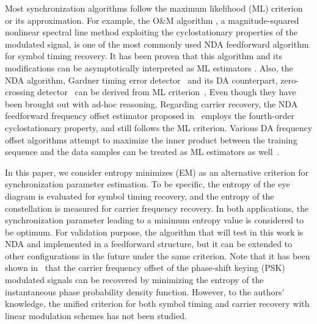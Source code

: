\documentclass[journal,comsoc]{IEEEtran}
\begin{document}
Most synchronization algorithms follow the maximum likelihood (ML) criterion or its approximation.
For example, the O\&M algorithm \cite{Oerder1988}, a magnitude-squared nonlinear spectral line method exploiting the cyclostationary properties of the modulated signal, is one of the most commonly used NDA feedforward algorithm for symbol timing recovery.
It has been proven that this algorithm and its modifications can be asymptotically interpreted as ML estimators \cite{YanWang2002,Lopez-Salcedo2006}.
Also, the NDA algorithm, Gardner timing error detector~\cite{Gardner1986} and its DA counterpart, zero-crossing detector~\cite{gardner1988demodulator} can be derived from ML criterion~\cite{Oerder1987},
Even though they have been brought out with ad-hoc reasoning,
Regarding carrier recovery, the NDA feedforward frequency offset estimator proposed in~\cite{Wang2004} employs the fourth-order cyclostationary property, and still follows the ML criterion.
Various DA frequency offset algorithms attempt to maximize the inner product between the  training sequence and the data samples can be treated as ML estimators as well~\cite{mengali1997synchronization}.

In this paper, we consider entropy minimizes (EM) as an alternative criterion for synchronization parameter estimation.
To be specific, the entropy of the eye diagram is evaluated for symbol timing recovery, and the entropy of the constellation is measured for carrier frequency recovery.
In both applications, the synchronization parameter leading to a minimum entropy value is considered to be optimum.
For validation purpose, the algorithm that will test in this work is NDA and implemented in a feedforward structure, but it can be extended to other configurations in the future under the same criterion.
Note that it has been shown in~\cite{Pedzisz2006} that the carrier frequency offset of the phase-shift keying (PSK) modulated signals can be recovered by minimizing the entropy of the instantaneous phase probability density function.
However, to the authors' knowledge,  the unified criterion for both symbol timing and carrier recovery with linear modulation schemes has not been studied.
\end{document}
